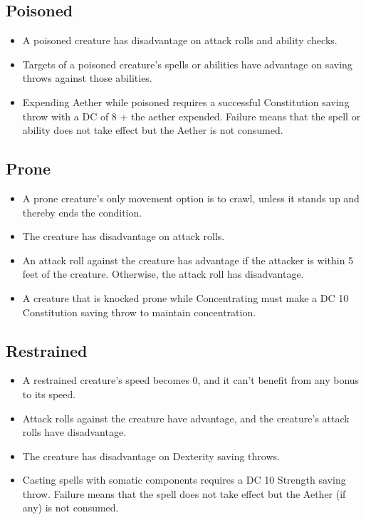 \subsection{Poisoned\label{condition:poisoned}}
\begin{itemize}
\item A poisoned creature has disadvantage on attack rolls and ability checks.
\item Targets of a poisoned creature's spells or abilities have advantage on saving throws against those abilities.
\item Expending Aether while poisoned requires a successful Constitution saving throw with a DC of 8 + the aether expended. Failure means that the spell or ability does not take effect but the Aether is not consumed. 
\end{itemize}

\subsection{Prone\label{condition:prone}}
\begin{itemize}
\item A prone creature's only movement option is to crawl, unless it stands up and thereby ends the condition.
\item The creature has disadvantage on attack rolls.
\item An attack roll against the creature has advantage if the attacker is within 5 feet of the creature. Otherwise, the attack roll has disadvantage.
\item A creature that is knocked prone while Concentrating must make a DC 10 Constitution saving throw to maintain concentration.
\end{itemize}

\subsection{Restrained\label{condition:restrained}}
\begin{itemize}
\item A restrained creature's speed becomes 0, and it can't benefit from any bonus to its speed.
\item Attack rolls against the creature have advantage, and the creature's attack rolls have disadvantage.
\item The creature has disadvantage on Dexterity saving throws.
\item Casting spells with somatic components requires a DC 10 Strength saving throw. Failure means that the spell does not take effect but the Aether (if any) is not consumed.
\end{itemize}

